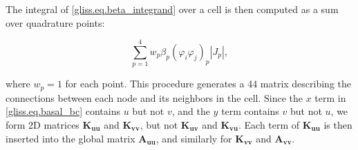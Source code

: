 \noindent
The integral of \eqref{gliss.eq.beta_integrand} over a cell is then computed as a sum over quadrature points:

\begin{equation}
  \label{gliss.eq.sum_over_qp_beta}
  \sum\limits_{p=1}^{4} {w_p \beta_p (\varphi_i \varphi_j)_p |J_p|},
\end{equation}

\noindent
where $w_p = 1$ for each point.  This procedure generates a 44 matrix
describing the connections between each node and its neighbors in the cell.
Since the $x$ term in \eqref{gliss.eq.basal_bc} 
contains $u$ but not $v$, and the $y$ term contains
$v$ but not $u$, we form 2D matrices $\mathbf{K_{uu}}$ and $\mathbf{K_{vv}}$, but not $\mathbf{K_{uv}}$ and $\mathbf{K_{vu}}$.
Each term of $\mathbf{K_{uu}}$ is then inserted into the global matrix $\mathbf{A_{uu}}$, and
similarly for $\mathbf{K_{vv}}$ and $\mathbf{A_{vv}}$.

